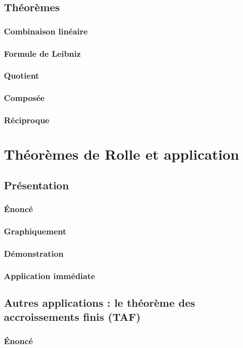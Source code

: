 \documentclass[12pt,a4paper,french]{book}
\begin{document}
		\subsection{Théorèmes}
			\subsubsection{Combinaison linéaire}
			\subsubsection{Formule de Leibniz}
			\subsubsection{Quotient}
			\subsubsection{Composée}
			\subsubsection{Réciproque}
	\section{Théorèmes de Rolle et application}
		\subsection{Présentation}
			\subsubsection{Énoncé}
			\subsubsection{Graphiquement}
			\subsubsection{Démonstration}
			\subsubsection{Application immédiate}
		\subsection{Autres applications : le théorème des accroissements finis (TAF)}
			\subsubsection{Énoncé}
\end{document}
